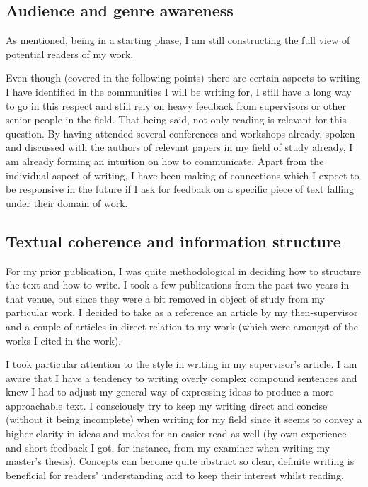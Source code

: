 \subsection{Audience and genre awareness}
\label{subsec:audience-genre}

As mentioned, being in a starting phase, I am still constructing the full
 view of potential readers of my work.

Even though (covered in the following points) there are certain aspects
 to writing I have identified in the communities I will be writing for,
 I still have a long way to go in this respect and still rely on heavy feedback
 from supervisors or other senior people in the field.
 That being said, not only reading is relevant for this question.
 By having attended several conferences and workshops already, spoken and
 discussed with the authors of relevant papers in my field of study already,
 I am already forming an intuition on how to communicate.
 Apart from the individual aspect of writing, I have been making of connections
 which I expect to be responsive in the future if I ask for feedback on
 a specific piece of text falling under their domain of work.


\subsection{Textual coherence and information structure}
\label{subsec:tex-cohere-struct}

For my prior publication, I was quite methodological in deciding how to
 structure the text and how to write.
 I took a few publications from the past two years in that venue, but since
 they were a bit removed in object of study from my particular work, I decided
 to take as a reference an article by my then-supervisor and a couple of
 articles in direct relation to my work (which were amongst of the works
 I cited in the work).

I took particular attention to the style in writing in my supervisor's article.
 I am aware that I have a tendency to writing overly complex compound sentences
 and knew I had to adjust my general way of expressing ideas to produce
 a more approachable text.
 I consciously try to keep my writing direct and concise (without it being
 incomplete) when writing for my field since it seems to convey a higher
 clarity in ideas and makes for an easier read as well (by own experience
 and short feedback I got, for instance, from my examiner when writing my
 master's thesis).
 Concepts can become quite abstract so clear, definite writing is beneficial
 for readers' understanding and to keep their interest whilst reading.

